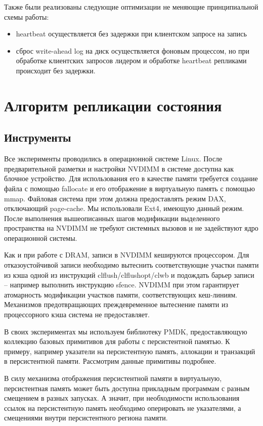 \documentclass[pdftex,ptm,12pt,a4paper]{report}
\theoremstyle{definition}
\begin{document}
Также были реализованы следующие оптимизации не меняющие принципиальной схемы работы:
\begin{itemize}
\item heartbeat осуществляется без задержки при клиентском запросе на запись
\item сброс write-ahead log на диск осуществляется фоновым процессом, но при обработке клиентских запросов лидером и обработке heartbeat репликами происходит без задержки.
\end{itemize}

\chapter{Алгоритм репликации состояния}
\section{Инструменты}

Все эксперименты проводились в операционной системе Linux. После предварительной разметки и настройки NVDIMM в системе доступна как блочное устройство.
Для использования его в качестве памяти требуется создание файла с помощью fallocate
и его отображение в виртуальную память с помощью mmap. Файловая система при этом должна предоставлять режим DAX, отключающий page-cache. Мы использовали Ext4, имеющую данный режим.
После выполнения вышеописанных шагов модификации выделенного пространства на NVDIMM не требуют системных вызовов и не задействуют ядро операционной системы.

Как и при работе с DRAM, записи в NVDIMM кешируются процессором.
Для отказоустойчивой записи необходимо вытеснить соответствующие участки памяти из кэша одной из инструкций clflush/clflushopt/clwb
и подождать барьер записи -- например выполнить инструкцию sfence.
NVDIMM при этом гарантирует атомарность модификации участков памяти, соответствующих кеш-линиям.
Механизмов предотвращающих преждевременное вытеснение памяти из процессорного кэша система не предоставляет.

В своих экспериментах мы используем библиотеку PMDK, предоставляющую коллекцию базовых примитивов для работы с персистентной памятью.
К примеру, например указатели на персистентную память, аллокации и транзакций в персистентной памяти. Рассмотрим данные примитивы подробнее.

В силу механизма отображения персистентной памяти в виртуальную, персистентная память может быть доступна прикладным программам с разным смещением в разных запусках.
А значит, при необходимости использования ссылок на персистентную память необходимо оперировать не указателями, а смещениями внутри персистентного региона памяти.
\end{document}
